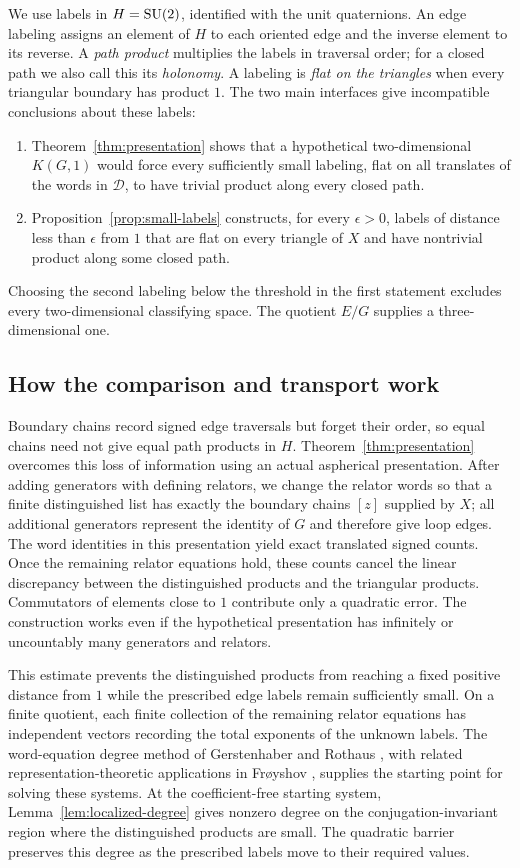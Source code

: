 We use labels in $H=\operatorname{SU}(2)$, identified with the unit quaternions. An edge labeling assigns an element of $H$ to each oriented edge and the inverse element to its reverse. A \emph{path product} multiplies the labels in traversal order; for a closed path we also call this its \emph{holonomy}. A labeling is \emph{flat on the triangles} when every triangular boundary has product $1$. The two main interfaces give incompatible conclusions about these labels:
\begin{enumerate}
\item Theorem~\ref{thm:presentation} shows that a hypothetical two-dimensional $K(G,1)$ would force every sufficiently small labeling, flat on all translates of the words in $\mathcal D$, to have trivial product along every closed path.
\item Proposition~\ref{prop:small-labels} constructs, for every $\epsilon>0$, labels of distance less than $\epsilon$ from $1$ that are flat on every triangle of $X$ and have nontrivial product along some closed path.
\end{enumerate}
Choosing the second labeling below the threshold in the first statement excludes every two-dimensional classifying space. The quotient $E/G$ supplies a three-dimensional one.

\subsection*{How the comparison and transport work}

Boundary chains record signed edge traversals but forget their order, so equal chains need not give equal path products in $H$. Theorem~\ref{thm:presentation} overcomes this loss of information using an actual aspherical presentation. After adding generators with defining relators, we change the relator words so that a finite distinguished list has exactly the boundary chains $[z]$ supplied by $X$; all additional generators represent the identity of $G$ and therefore give loop edges. The word identities in this presentation yield exact translated signed counts. Once the remaining relator equations hold, these counts cancel the linear discrepancy between the distinguished products and the triangular products. Commutators of elements close to $1$ contribute only a quadratic error. The construction works even if the hypothetical presentation has infinitely or uncountably many generators and relators.

This estimate prevents the distinguished products from reaching a fixed positive distance from $1$ while the prescribed edge labels remain sufficiently small. On a finite quotient, each finite collection of the remaining relator equations has independent vectors recording the total exponents of the unknown labels. The word-equation degree method of Gerstenhaber and Rothaus \cite{GR1962}, with related representation-theoretic applications in Fr\o yshov \cite{Froyshov2013}, supplies the starting point for solving these systems. At the coefficient-free starting system, Lemma~\ref{lem:localized-degree} gives nonzero degree on the conjugation-invariant region where the distinguished products are small. The quadratic barrier preserves this degree as the prescribed labels move to their required values.

